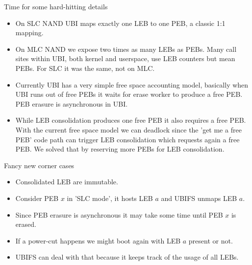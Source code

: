 \documentclass[aspectratio=169,obeyspaces,spaces,hyphens,dvipsnames]{beamer}
\begin{document}
\begin{frame}{Time for some hard-hitting details}
  \begin{itemize}
  \item On SLC NAND UBI maps exactly one LEB to one PEB, a classic 1:1 mapping.
  \item On MLC NAND we expose two times as many LEBs as PEBs. Many call sites within UBI,
        both kernel and userspace, use LEB counters but mean PEBs. For SLC it was the same,
        not on MLC.
  \item Currently UBI has a very simple free space accounting model, basically when UBI runs out of
        free PEBs it waits for erase worker to produce a free PEB. PEB erasure is asynchronous in UBI.
  \item While LEB consolidation produces one free PEB it also requires a free PEB. With the current free space
        model we can deadlock since the 'get me a free PEB' code path can trigger LEB consolidation which
        requests again a free PEB. We solved that by reserving more PEBs for LEB consolidation. 
  \end{itemize}
\end{frame}

\begin{frame}{Fancy new corner cases}
  \begin{itemize}
  \item Consolidated LEB are immutable.
  \item Consider PEB $x$ in 'SLC mode', it hosts LEB $a$ and UBIFS unmaps LEB $a$.
  \item Since PEB erasure is asynchronous it may take some time until PEB $x$ is erased.
  \item If a power-cut happens we might boot again with LEB $a$ present or not.
  \item UBIFS can deal with that because it keeps track of the usage of all LEBs.
  \end{itemize}
\end{frame}
\end{document}
